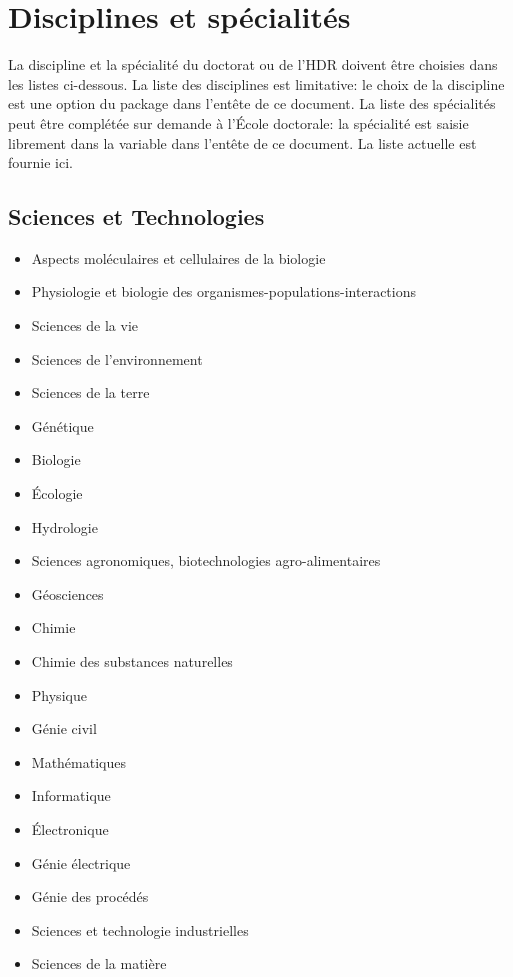 \documentclass[
  a4paper, %
  11pt, extrafontsizes, %
  onecolumn, %
  openright, %
]{memoir}
\begin{document}
\chapter{Disciplines et spécialités}

La discipline et la spécialité du doctorat ou de l’HDR doivent être choisies dans les listes ci-dessous.
La liste des disciplines est limitative: le choix de la discipline est une option du package  dans l'entête de ce document. 
La liste des spécialités peut être complétée sur demande à l’École doctorale: la spécialité est saisie librement dans la variable  dans l'entête de ce document.
La liste actuelle est fournie ici.

\section{Sciences et Technologies}

\begin{itemize}
  \item Aspects moléculaires et cellulaires de la biologie
  \item Physiologie et biologie des organismes-populations-interactions
  \item Sciences de la vie
  \item Sciences de l’environnement
  \item Sciences de la terre
  \item Génétique 
  \item Biologie
  \item Écologie
  \item Hydrologie
  \item Sciences agronomiques, biotechnologies agro-alimentaires 
  \item Géosciences
  \item Chimie 
  \item Chimie des substances naturelles
  \item Physique
  \item Génie civil 
  \item Mathématiques 
  \item Informatique
  \item Électronique
  \item Génie électrique 
  \item Génie des procédés
  \item Sciences et technologie industrielles 
  \item Sciences de la matière
\end{itemize}	
\end{document}
